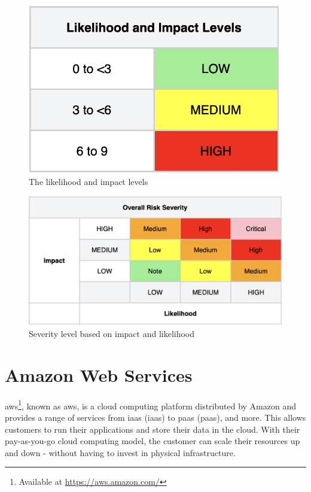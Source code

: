 \vspace{2mm}
\begin{figure}[H]
    \centering
    \includegraphics[scale=0.5]{Images/OWASP-likelihood.png}
    \caption{The likelihood and impact levels}
    \label{fig: Impact levels}
\end{figure}

\vspace{2mm}
\begin{figure}[H]
    \centering
    \includegraphics[scale=0.4]{Images/OWASP-severity.png}
    \caption{Severity level based on impact and likelihood}
    \label{fig: OWASP Severity Scale}
\end{figure}


\section{Amazon Web Services}
\acrlong{aws}\footnote{Available at \url{https://aws.amazon.com/}}, known as \acrshort{aws}, is a cloud computing platform distributed by Amazon and provides a range of services from \acrlong{iaas} (\acrshort{iaas}) to \acrlong{paas} (\acrshort{paas}), and more. This allows customers to run their applications and store their data in the cloud. With their pay-as-you-go cloud computing model, the customer can scale their resources up and down - without having to invest in physical infrastructure.\cite{aws}  

